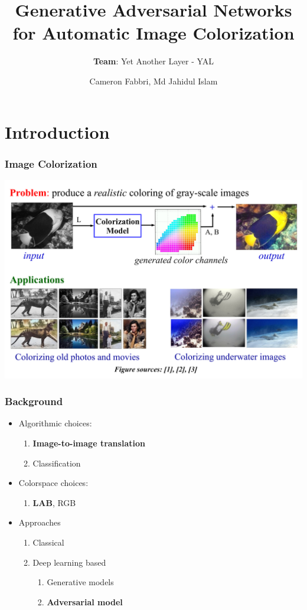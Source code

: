 \documentclass{beamer}
\title{Generative Adversarial Networks for Automatic Image Colorization}
\subtitle{\textbf{Team}: Yet Another Layer - YAL}
\author{Cameron Fabbri, Md Jahidul Islam}
\begin{document}
\date{}
\begin{frame}
\thispagestyle{empty}
\titlepage
\end{frame}

\section*{Introduction}
\begin{frame}
\frametitle{\textbf{Image Colorization}}

\includegraphics[width=\linewidth]{6.pdf}



\end{frame}

\begin{frame}
\frametitle{\textbf{Background}}
\begin{itemize}
  \item Algorithmic choices:
	\begin{enumerate}[$-$]
	\item  \textbf{Image-to-image translation} 
	\item Classification
	\end{enumerate}
	
	\item Colorspace choices:
  
	\begin{enumerate}[$-$]
	\item  \textbf{LAB}, RGB
	\end{enumerate}
	
	\item Approaches
  
	\begin{enumerate}[$-$]
	\item Classical
	\item Deep learning based
	\begin{enumerate}[$-$]
	  \item Generative models
	  \item \textbf{Adversarial model}
	\end{enumerate}	 
	\end{enumerate}
	
\end{itemize}
\end{frame}
\end{document}
